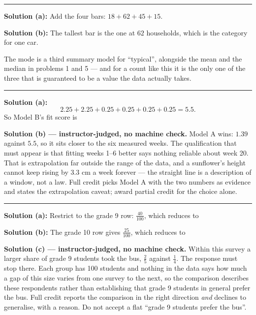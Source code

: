 \documentclass[12pt]{article}
\begin{document}
\vspace{0.15cm}\noindent\rule{\linewidth}{0.2pt}\vspace{0.15cm}


\textbf{Solution (a):} Add the four bars: $18 + 62 + 45 + 15$. 

\textbf{Solution (b):} The tallest bar is the one at $62$ households, which is
the category for one car. 

The mode is a third summary model for ``typical'', alongside the mean and the
median in problems 1 and 5 --- and for a count like this it is the only one of
the three that is guaranteed to be a value the data actually takes.

\vspace{0.15cm}\noindent\rule{\linewidth}{0.2pt}\vspace{0.15cm}


\textbf{Solution (a):}
\[
  2.25 + 2.25 + 0.25 + 0.25 + 0.25 + 0.25 = 5.5 .
\]
So Model B's fit score is 

\textbf{Solution (b) --- instructor-judged, no machine check.} Model A wins:
$1.39$ against $5.5$, so it sits closer to the six measured weeks. The
qualification that must appear is that fitting weeks 1--6 better says nothing
reliable about week 20. That is extrapolation far outside the range of the data,
and a sunflower's height cannot keep rising by $3.3$ cm a week forever --- the
straight line is a description of a window, not a law. Full credit picks Model A
with the two numbers as evidence and states the extrapolation caveat; award
partial credit for the choice alone.

\vspace{0.15cm}\noindent\rule{\linewidth}{0.2pt}\vspace{0.15cm}


\textbf{Solution (a):} Restrict to the grade 9 row: $\frac{40}{100}$, which
reduces to 

\textbf{Solution (b):} The grade 10 row gives $\frac{25}{100}$, which reduces to

\textbf{Solution (c) --- instructor-judged, no machine check.} Within this
survey a larger share of grade 9 students took the bus, $\frac{2}{5}$ against
$\frac{1}{4}$. The response must stop there. Each group has 100 students and
nothing in the data says how much a gap of this size varies from one survey to
the next, so the comparison describes these respondents rather than establishing
that grade 9 students in general prefer the bus. Full credit reports the
comparison in the right direction \emph{and} declines to generalise, with a
reason. Do not accept a flat ``grade 9 students prefer the bus''.
\end{document}
